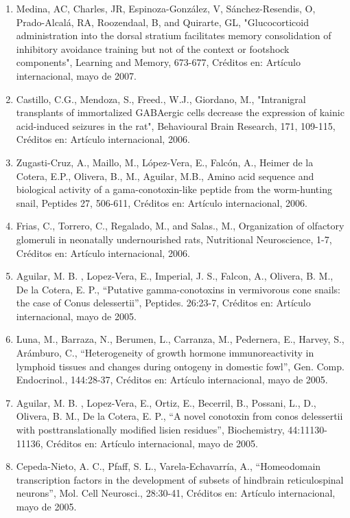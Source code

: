 \documentclass[12pt]{article}
\begin{document}
\begin{enumerate}
\item Medina, AC, Charles, JR, Espinoza-González, V, Sánchez-Resendis, O, Prado-Alcalá, RA, Roozendaal, B, and Quirarte, GL, 
"Glucocorticoid administration into the dorsal stratium facilitates memory consolidation of inhibitory avoidance training but not of 
the context or footshock components", Learning and Memory, 673-677, Créditos en: Artículo internacional, mayo de 2007.

\item Castillo, C.G., Mendoza, S., Freed., W.J., Giordano, M., "Intranigral transplants of immortalized GABAergic cells decrease the 
expression of kainic acid-induced seizures in the rat", Behavioural Brain Research, 171, 109-115, Créditos en: Artículo internacional, 
2006.

\item Zugasti-Cruz, A., Maillo, M., López-Vera, E., Falcón, A., Heimer de la Cotera, E.P., Olivera, B., M., Aguilar, M.B., Amino acid 
sequence and biological activity of a gama-conotoxin-like peptide from the worm-hunting snail, Peptides 27, 506-611, Créditos en: 
Artículo internacional, 2006.

\item Frias, C., Torrero, C., Regalado, M., and Salas., M., Organization of olfactory glomeruli in neonatally undernourished rats, 
Nutritional Neuroscience, 1-7, Créditos en: Artículo internacional, 2006.

\item Aguilar, M. B. , Lopez-Vera, E., Imperial, J. S., Falcon, A., Olivera, B. M., De la Cotera, E. P., “Putative gamma-conotoxins in 
vermivorous cone snails: the case of Conus delessertii”, Peptides. 26:23-7, Créditos en: Artículo internacional, mayo de 2005.

\item Luna, M., Barraza, N., Berumen, L., Carranza, M., Pedernera, E., Harvey, S., Arámburo, C., “Heterogeneity of growth hormone 
immunoreactivity in lymphoid tissues and changes during ontogeny in domestic fowl”, Gen. Comp. Endocrinol., 144:28-37, Créditos en: 
Artículo internacional, mayo de 2005.

\item Aguilar, M. B. , Lopez-Vera, E., Ortiz, E., Becerril, B., Possani, L., D., Olivera, B. M., De la Cotera, E. P., “A novel 
conotoxin from conos delessertii with posttranslationally modified lisien residues”, Biochemistry, 44:11130-11136, 
Créditos en: Artículo internacional, mayo de 2005.

\item Cepeda-Nieto, A. C., Pfaff, S. L., Varela-Echavarría, A., “Homeodomain transcription factors in the development of subsets of 
hindbrain reticulospinal neurons”, Mol. Cell Neurosci., 28:30-41, Créditos en: Artículo internacional, mayo de 2005.


\end{enumerate}
\end{document}
